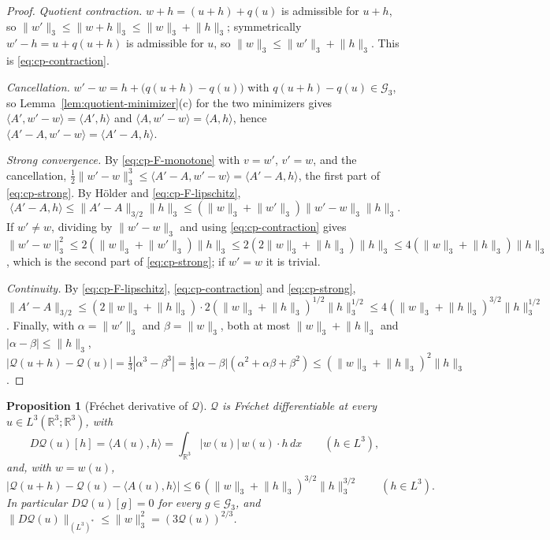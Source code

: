 \documentclass[11pt]{article}
\newtheorem{proposition}[theorem]{Proposition}
\theoremstyle{definition}
\theoremstyle{plain}
\newcommand{\R}{\mathbb R}
\newcommand{\norm}[1]{\lVert #1\rVert}
\begin{document}
\begin{proof}
\emph{Quotient contraction.}  $w+h=(u+h)+q(u)$ is admissible for $u+h$,
so $\norm{w'}_3\le\norm{w+h}_3\le\norm w_3+\norm h_3$; symmetrically
$w'-h=u+q(u+h)$ is admissible for $u$, so
$\norm w_3\le\norm{w'}_3+\norm h_3$.  This is \eqref{eq:cp-contraction}.

\emph{Cancellation.}  $w'-w=h+\bigl(q(u+h)-q(u)\bigr)$ with
$q(u+h)-q(u)\in\mathcal G_3$, so Lemma~\ref{lem:quotient-minimizer}(c)
for the two minimizers gives $\langle A',w'-w\rangle=\langle A',h\rangle$
and $\langle A,w'-w\rangle=\langle A,h\rangle$, hence
$\langle A'-A,w'-w\rangle=\langle A'-A,h\rangle$.

\emph{Strong convergence.}  By \eqref{eq:cp-F-monotone} with $v=w'$,
$v'=w$, and the cancellation,
$\frac12\norm{w'-w}_3^3\le\langle A'-A,w'-w\rangle=\langle A'-A,h\rangle$,
the first part of \eqref{eq:cp-strong}.  By H\"older and
\eqref{eq:cp-F-lipschitz},
\[
 \langle A'-A,h\rangle\le\norm{A'-A}_{3/2}\norm h_3
 \le(\norm w_3+\norm{w'}_3)\norm{w'-w}_3\norm h_3 .
\]
If $w'\ne w$, dividing by $\norm{w'-w}_3$ and using
\eqref{eq:cp-contraction} gives
$\norm{w'-w}_3^2\le2(\norm w_3+\norm{w'}_3)\norm h_3
\le2(2\norm w_3+\norm h_3)\norm h_3\le4(\norm w_3+\norm h_3)\norm h_3$,
which is the second part of \eqref{eq:cp-strong}; if $w'=w$ it is
trivial.

\emph{Continuity.}  By \eqref{eq:cp-F-lipschitz}, \eqref{eq:cp-contraction}
and \eqref{eq:cp-strong},
$\norm{A'-A}_{3/2}\le(2\norm w_3+\norm h_3)\cdot2(\norm w_3+\norm h_3)^{1/2}\norm h_3^{1/2}
\le4(\norm w_3+\norm h_3)^{3/2}\norm h_3^{1/2}$.  Finally, with
$\alpha=\norm{w'}_3$ and $\beta=\norm w_3$, both at most
$\norm w_3+\norm h_3$ and $|\alpha-\beta|\le\norm h_3$,
$|\mathcal Q(u+h)-\mathcal Q(u)|=\frac13|\alpha^3-\beta^3|
=\frac13|\alpha-\beta|(\alpha^2+\alpha\beta+\beta^2)
\le(\norm w_3+\norm h_3)^2\norm h_3$.
\end{proof}

\begin{proposition}[Fr\'echet derivative of $\mathcal Q$]
\label{prop:quotient-derivative}
$\mathcal Q$ is Fr\'echet differentiable at every $u\in L^3(\R^3;\R^3)$,
with
\begin{equation}\label{eq:cp-derivative}
 D\mathcal Q(u)[h]=\langle A(u),h\rangle=\int_{\R^3}|w(u)|\,w(u)\cdot h\,dx
 \qquad(h\in L^3),
\end{equation}
and, with $w=w(u)$,
\begin{equation}\label{eq:cp-derivative-remainder}
 \bigl|\mathcal Q(u+h)-\mathcal Q(u)-\langle A(u),h\rangle\bigr|
 \le6\,(\norm w_3+\norm h_3)^{3/2}\norm h_3^{3/2}
 \qquad(h\in L^3).
\end{equation}
In particular $D\mathcal Q(u)[g]=0$ for every $g\in\mathcal G_3$, and
$\norm{D\mathcal Q(u)}_{(L^3)^*}\le\norm w_3^2=(3\mathcal Q(u))^{2/3}$.
\end{proposition}
\end{document}
